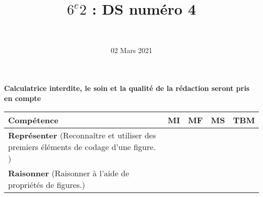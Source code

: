 \documentclass[a4paper,11pt]{exam}
\author{\ }
\date{02 Mars 2021}
\title{$6^e 2$ : DS num\'ero 4}
\begin{document}
%	

	\maketitle
	
\begin{center}
	\textbf{Calculatrice interdite, le soin et la qualité de la rédaction seront pris en compte}
\end{center}

\begin{small}
	\begin{center}
		\begin{tabular}{|@{\ }l@{\ }|@{\ }c@{\ }|@{\ }c@{\ }|@{\ }c@{\ }|@{\ }c@{\ }|}
			\hline
			\textbf{Compétence} & \textbf{MI} & \textbf{MF} & \textbf{MS} & \textbf{TBM} \\
			\hline
			\textbf{Représenter} (Reconnaître et utiliser des premiers éléments de codage d'une figure. ) &  \ \ & \ \ & \ \ & \ \  \\
			\hline	
			\textbf{Raisonner} (Raisonner à l'aide de propriétés de figures.) & \ \ & \ \ &  \ \  & \ \ \\
			\hline
		\end{tabular}
	\end{center}
\end{small}	

	
	
	













%





\label{LastPage}
\end{document}
